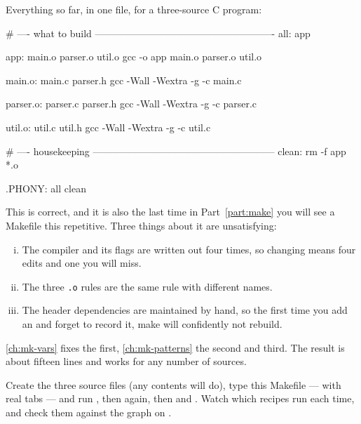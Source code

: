 Everything so far, in one file, for a three-source C program:

\begin{makecode}
# ---- what to build -------------------------------------------------------
all: app

app: main.o parser.o util.o
    gcc -o app main.o parser.o util.o

main.o: main.c parser.h
    gcc -Wall -Wextra -g -c main.c

parser.o: parser.c parser.h
    gcc -Wall -Wextra -g -c parser.c

util.o: util.c util.h
    gcc -Wall -Wextra -g -c util.c

# ---- housekeeping --------------------------------------------------------
clean:
    rm -f app *.o

.PHONY: all clean
\end{makecode}

This is correct, and it is also the last time in Part~\ref{part:make} you will
see a Makefile this repetitive. Three things about it are unsatisfying:

\begin{enumerate}[(i)]
	\item The compiler and its flags are written out four times, so changing
	       means four edits and one you will miss.
	\item The three \texttt{.o} rules are the same rule with different names.
	\item The header dependencies are maintained by hand, so the first time you add
	      an  and forget to record it, make will confidently not
	      rebuild.
\end{enumerate}

\autoref{ch:mk-vars} fixes the first, \autoref{ch:mk-patterns} the second and
third. The result is about fifteen lines and works for any number of sources.

\begin{tryit}
	Create the three source files (any contents will do), type this Makefile ---
	with real tabs --- and run , then  again, then
	 and . Watch which recipes run each time, and
	check them against the graph on .
\end{tryit}
